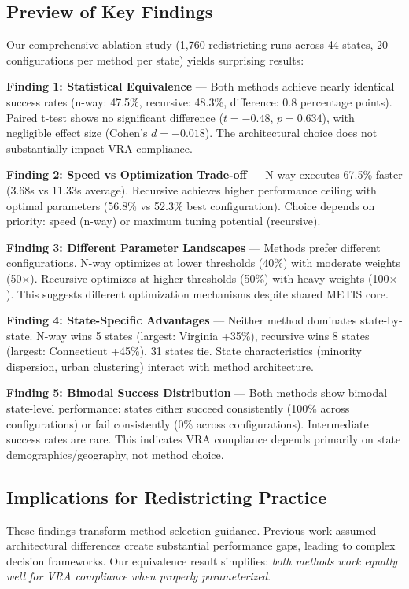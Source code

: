 \subsection{Preview of Key Findings}

Our comprehensive ablation study (1,760 redistricting runs across 44 states, 20 configurations per method per state) yields surprising results:

\textbf{Finding 1: Statistical Equivalence} — Both methods achieve nearly identical success rates (n-way: 47.5\%, recursive: 48.3\%, difference: 0.8 percentage points). Paired t-test shows no significant difference ($t=-0.48$, $p=0.634$), with negligible effect size (Cohen's $d=-0.018$). The architectural choice does not substantially impact VRA compliance.

\textbf{Finding 2: Speed vs Optimization Trade-off} — N-way executes 67.5\% faster (3.68s vs 11.33s average). Recursive achieves higher performance ceiling with optimal parameters (56.8\% vs 52.3\% best configuration). Choice depends on priority: speed (n-way) or maximum tuning potential (recursive).

\textbf{Finding 3: Different Parameter Landscapes} — Methods prefer different configurations. N-way optimizes at lower thresholds (40\%) with moderate weights (50$\times$). Recursive optimizes at higher thresholds (50\%) with heavy weights (100$\times$). This suggests different optimization mechanisms despite shared METIS core.

\textbf{Finding 4: State-Specific Advantages} — Neither method dominates state-by-state. N-way wins 5 states (largest: Virginia +35\%), recursive wins 8 states (largest: Connecticut +45\%), 31 states tie. State characteristics (minority dispersion, urban clustering) interact with method architecture.

\textbf{Finding 5: Bimodal Success Distribution} — Both methods show bimodal state-level performance: states either succeed consistently (100\% across configurations) or fail consistently (0\% across configurations). Intermediate success rates are rare. This indicates VRA compliance depends primarily on state demographics/geography, not method choice.

\subsection{Implications for Redistricting Practice}

These findings transform method selection guidance. Previous work assumed architectural differences create substantial performance gaps, leading to complex decision frameworks. Our equivalence result simplifies: \textit{both methods work equally well for VRA compliance when properly parameterized}.

